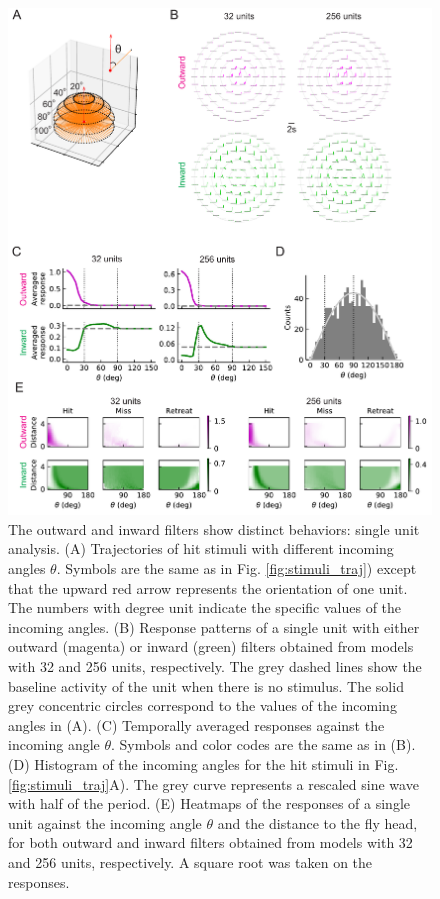 \documentclass[pdftex,9pt,lineno]{elife}
\begin{document}
\begin{figure}
\includegraphics[width=\linewidth]{figures/compare_outward_inward_single_unit_paper.pdf}
\caption{The outward and inward filters show distinct behaviors: single unit analysis. (A) Trajectories of hit stimuli with different incoming angles $\theta$. Symbols are the same as in Fig. \ref{fig:stimuli_traj}) except that the upward red arrow represents the orientation of one unit. The numbers with degree unit indicate the specific values of the incoming angles. (B) Response patterns of a single unit with either outward (magenta) or inward (green) filters obtained from models with 32 and 256 units, respectively. The grey dashed lines show the baseline activity of the unit when there is no stimulus. The solid grey concentric circles correspond to the values of the incoming angles in (A). (C) Temporally averaged responses against the incoming angle $\theta$. Symbols and color codes are the same as in (B). (D) Histogram of the incoming angles for the hit stimuli in Fig. \ref{fig:stimuli_traj}A). The grey curve represents a rescaled sine wave with half of the period. (E) Heatmaps of the responses of a single unit against the incoming angle $\theta$ and the distance to the fly head, for both outward and inward filters obtained from models with 32 and 256 units, respectively. A square root was taken on the responses.}

\end{figure}
\end{document}
